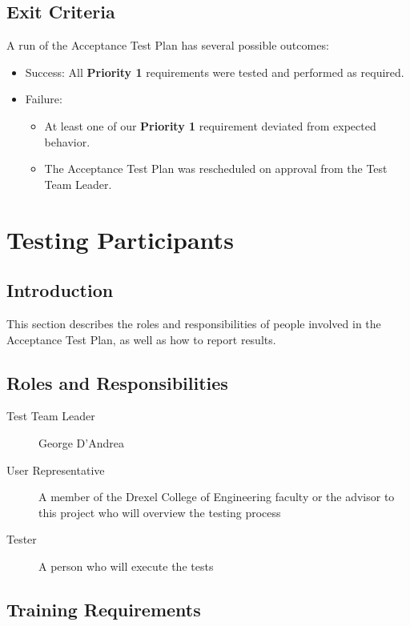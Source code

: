 \documentclass{article}
\begin{document}
\subsection{Exit Criteria}
	A run of the Acceptance Test Plan has several possible outcomes:
	\begin{itemize}
		\item Success: All \textbf{Priority 1} requirements were tested and 
		performed as required.
		\item Failure:
			\begin{itemize}
				\item At least one of our \textbf{Priority 1} requirement 
				deviated from expected behavior.
				\item The Acceptance Test Plan was rescheduled on approval from 
				the Test Team Leader.
			\end{itemize}
		
	\end{itemize}
	

\section{Testing Participants} %

\subsection{Introduction}

This section describes the roles and responsibilities of people involved in the
Acceptance Test Plan, as well as how to report results.

\subsection{Roles and Responsibilities}

\begin{description}
\item[Test Team Leader] George D'Andrea
\item[User Representative] A member of the Drexel College of Engineering
faculty or the advisor to this project who will overview the testing process
\item[Tester] A person who will execute the tests
\end{description}

\subsection{Training Requirements}
\end{document}
